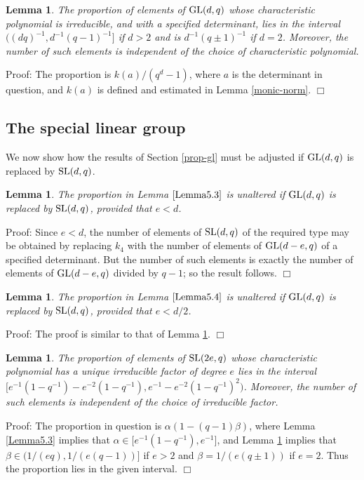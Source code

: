 \documentclass[12pt]{article}
\newtheorem{lemma}[definition]{Lemma}
\newenvironment{proof}{\normalsize {\sc Proof}:}{{\hfill $\Box$ \\}}
\def\SL{{\rm SL}}
\def\GL{{\rm GL}}
\def\ADD{Moreover, the number of such elements is
independent of the choice of irreducible factor.}
\begin{document}
\begin{lemma}\label{Lemma5.5b}
The proportion of elements of $\GL(d,q)$ whose characteristic polynomial is
irreducible, and with a specified determinant, lies in the interval  
$\big((dq)^{-1}, d^{-1}(q - 1)^{-1}\big]$ if $d >2$ and
is $d^{-1}(q \pm 1)^{-1}$ if $d = 2$.  Moreover, the 
number of such elements is independent of the choice
of characteristic polynomial.
\end{lemma}
\begin{proof}
The proportion is $k(a)/(q^d-1)$, where $a$ is the determinant 
in question, and $k(a)$ is defined and
estimated in Lemma \ref{monic-norm}.  
\end{proof}
\subsection{The special linear group}
We now show how the results of Section \ref{prop-gl} 
must be adjusted if $\GL(d,q)$ is replaced by $\SL(d,q)$.

\begin{lemma}\label{Lemma5.5a} 
The proportion in Lemma $\ref{Lemma5.3}$ is unaltered if
$\GL(d,q)$ is replaced by $\SL(d,q)$, provided that $e<d$. 
\end{lemma}
\begin{proof}
Since $e<d$, the number of elements of $\SL(d,q)$ of the required type
may be obtained by replacing $k_4$ with
the number of elements of $\GL(d-e,q)$ of a specified determinant.
But the number of such elements is exactly the number of elements of
$\GL(d-e,q)$ divided by $q-1$; so the result follows.
\end{proof}

\begin{lemma}\label{Lemma5.5c}
The proportion in Lemma $\ref{Lemma5.4}$ is unaltered if
$\GL(d,q)$ is replaced by $\SL(d,q)$, provided that $e<d/2$. 
\end{lemma}
\begin{proof}
The proof is similar to that of Lemma \ref{Lemma5.5a}.
\end{proof}

\begin{lemma}\label{Lemma5.5d}
The proportion of elements of $\SL(2e,q)$ whose characteristic 
polynomial has a unique irreducible factor
of degree $e$ lies in the interval 
$\big[e^{-1}(1-q^{-1})-e^{-2}(1-q^{-1}), e^{-1}-e^{-2}(1-q^{-1})^2\big)$.
\ADD
\end{lemma}
\begin{proof}
The proportion in question is $\alpha(1-(q-1)\beta)$, 
where Lemma \ref{Lemma5.3} implies that 
$\alpha\in\big[e^{-1}(1-q^{-1}), e^{-1}\big]$, and
Lemma \ref{Lemma5.5b} implies that 
$\beta\in\big(1/(eq), 1/(e(q - 1))\big]$ if $e > 2$ 
and $\beta = 1/(e(q \pm 1))$ if $e = 2$.
Thus the proportion lies in the given interval.
\end{proof}
\end{document}
